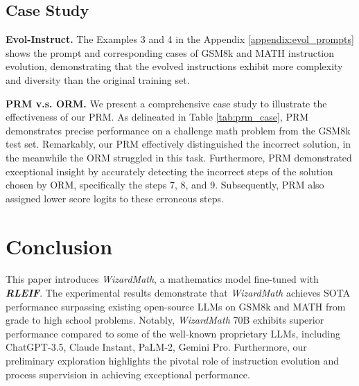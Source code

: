 \subsection{Case Study}

\textbf{Evol-Instruct.} The Examples 3 and 4 in the Appendix \ref{appendix:evol_prompts} shows the prompt and corresponding cases of GSM8k and MATH instruction evolution, demonstrating that the evolved instructions exhibit more complexity and diversity than the original training set.

\textbf{PRM v.s. ORM.} We present a comprehensive case study to  illustrate the effectiveness of our PRM. As delineated in Table \ref{tab:prm_case}, PRM demonstrates precise performance on a challenge math problem from the GSM8k test set. Remarkably, our PRM effectively distinguished the incorrect solution, in the meanwhile the ORM struggled in this task. Furthermore, PRM demonstrated exceptional insight by accurately detecting the incorrect steps of the solution chosen by ORM, specifically the steps 7, 8, and 9. Subsequently, PRM also assigned lower score logits to these erroneous steps.

\section{Conclusion}

This paper introduces \emph{WizardMath}, a mathematics model fine-tuned with \textbf{\emph{RLEIF}}. The experimental results demonstrate that \emph{WizardMath} achieves SOTA performance surpassing existing open-source LLMs on  GSM8k and MATH from grade to high school problems. Notably,  \emph{WizardMath} 70B exhibits superior performance compared to some of the well-known proprietary  LLMs, including ChatGPT-3.5, Claude Instant, PaLM-2, Gemini Pro. Furthermore, our preliminary exploration highlights the pivotal role of instruction evolution and process supervision in achieving exceptional performance.


